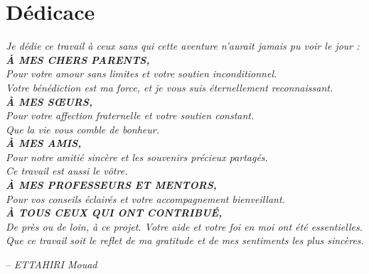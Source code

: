 \chapter*{Dédicace}
\adjustmtc
\thispagestyle{MyStyle}

\begin{center}
{\itshape
Je dédie ce travail à ceux sans qui cette aventure n'aurait jamais pu voir le jour :\\[0.6em]
\textbf{À MES CHERS PARENTS,}\\
Pour votre amour sans limites et votre soutien inconditionnel.\\
Votre bénédiction est ma force, et je vous suis éternellement reconnaissant.\\[0.6em]
\textbf{À MES SŒURS,}\\
Pour votre affection fraternelle et votre soutien constant.\\
Que la vie vous comble de bonheur.\\[0.6em]
\textbf{À MES AMIS,}\\
Pour notre amitié sincère et les souvenirs précieux partagés.\\
Ce travail est aussi le vôtre.\\[0.6em]
\textbf{À MES PROFESSEURS ET MENTORS,}\\
Pour vos conseils éclairés et votre accompagnement bienveillant.\\[0.6em]
\textbf{À TOUS CEUX QUI ONT CONTRIBUÉ,}\\
De près ou de loin, à ce projet. Votre aide et votre foi en moi ont été essentielles.\\[0.6em]
Que ce travail soit le reflet de ma gratitude et de mes sentiments les plus sincères.}
\end{center}

\begin{flushright}
-- \textit{ETTAHIRI Mouad}
\end{flushright}
